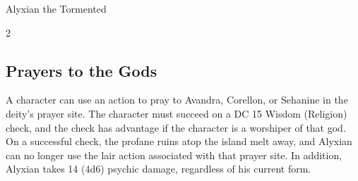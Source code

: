 \documentclass[10pt,a4paper,twoside,bg=none,twocolumn,openany,nodeprecatedcode]{dndbook}
\begin{document}
\begin{DndMonster}[float*=b,width=\textwidth + 8pt]{Alyxian the Tormented}
\begin{multicols}{2}
\begin{description}[nolistsep]
\end{description}

\subsection{Prayers to the Gods}
A character can use an action to pray to Avandra, Corellon, or Sehanine in the deity's prayer site. The character must succeed on a DC 15 Wisdom (Religion) check, and the check has advantage if the character is a worshiper of that god. On a successful check, the profane ruins atop the island melt away, and Alyxian can no longer use the lair action associated with that prayer site. In addition, Alyxian takes 14 (4d6) psychic damage, regardless of his current form.

\end{multicols}
\end{DndMonster}
\end{document}
